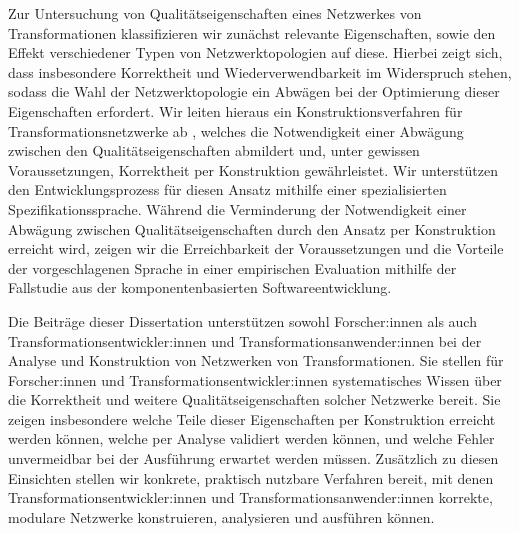 Zur Untersuchung von Qualitätseigenschaften eines Netzwerkes von Transformationen klassifizieren wir zunächst relevante Eigenschaften, sowie den Effekt verschiedener Typen von Netzwerktopologien auf diese. %
Hierbei zeigt sich, dass insbesondere Korrektheit und Wiederverwendbarkeit im Widerspruch stehen, sodass die Wahl der Netzwerktopologie ein Abwägen bei der Optimierung dieser Eigenschaften erfordert.
Wir leiten hieraus ein Konstruktionsverfahren für Transformationsnetzwerke ab%
, welches die Notwendigkeit einer Abwägung zwischen den Qualitätseigenschaften abmildert und, unter gewissen Voraussetzungen, Korrektheit per Konstruktion gewährleistet. %
Wir unterstützen den Entwicklungsprozess für diesen Ansatz mithilfe einer spezialisierten Spezifikationssprache.
Während die Verminderung der Notwendigkeit einer Abwägung zwischen Qualitätseigenschaften durch den Ansatz per Konstruktion erreicht wird, zeigen wir die Erreichbarkeit der Voraussetzungen und die Vorteile der vorgeschlagenen Sprache in einer empirischen Evaluation mithilfe der Fallstudie aus der komponentenbasierten Softwareentwicklung. %

Die Beiträge dieser Dissertation unterstützen sowohl Forscher:innen als auch Transformationsentwickler:innen und Transformationsanwender:innen bei der Analyse und Konstruktion von Netzwerken von Transformationen. %
Sie stellen für Forscher:innen und Transformationsentwickler:innen systematisches Wissen über die Korrektheit und weitere Qualitätseigenschaften solcher Netzwerke bereit.
Sie zeigen insbesondere welche Teile dieser Eigenschaften per Konstruktion erreicht werden können, welche per Analyse validiert werden können, und welche Fehler unvermeidbar bei der Ausführung erwartet werden müssen.
Zusätzlich zu diesen Einsichten stellen wir konkrete, praktisch nutzbare Verfahren bereit, mit denen Transformationsentwickler:innen und Transformationsanwender:innen korrekte, modulare Netzwerke konstruieren, analysieren und ausführen können.

